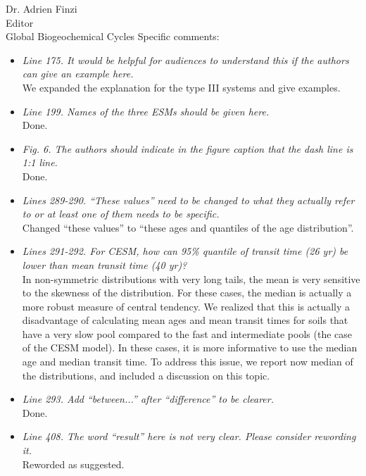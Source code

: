 \documentclass[11pt]{bgcletter}
\begin{document}
\begin{letter}{Dr. Adrien Finzi\\
 Editor \\ Global Biogeochemical Cycles}
Specific comments:
\begin{itemize}
\item {\it Line 175. It would be helpful for audiences to understand this if the authors can give an example here.} \\
	{\color{blue} We expanded the explanation for the type III systems and give examples. }
\item {\it Line 199. Names of the three ESMs should be given here.} \\
	{\color{blue} Done.}
\item {\it Fig. 6. The authors should indicate in the figure caption that the dash line is 1:1 line.} \\
	{\color{blue} Done.}
\item{\it  Lines 289-290. ``These values'' need to be changed to what they actually refer to or at least one of them needs to be specific.} \\
	{\color{blue} Changed ``these values'' to ``these ages and quantiles of the age distribution''.}
\item {\it Lines 291-292. For CESM, how can 95\% quantile of transit time (26 yr) be lower than mean transit time (40 yr)?} \\
	{\color{blue} In non-symmetric distributions with very long tails, the mean is very sensitive to the skewness of the distribution. For these cases, the median is actually a more robust measure of central tendency. We realized that this is actually a disadvantage of calculating mean ages and mean transit times for soils that have a very slow pool compared to the fast and intermediate pools (the case of the CESM model). In these cases, it is more informative to use the median age and median transit time. To address this issue, we report now median of the distributions, and included a discussion on this topic.}
\item {\it Line 293. Add ``between...'' after ``difference'' to be clearer.} \\
	{\color{blue} Done.}
\item {\it Line 408. The word ``result'' here is not very clear. Please consider rewording it.} \\
	{\color{blue} Reworded as suggested.}
\end{itemize}



\end{letter}
\end{document}
